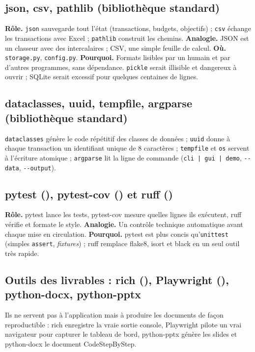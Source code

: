 \documentclass[11pt,a4paper]{article}
\newcommand{\code}[1]{{\NoAutoSpacing\texttt{#1}}}
\begin{document}
\subsection{json, csv, pathlib (bibliothèque standard)}
\textbf{Rôle.} \code{json} sauvegarde tout l'état (transactions, budgets, objectifs) ;
\code{csv} échange les transactions avec Excel ; \code{pathlib} construit les chemins.
\textbf{Analogie.} JSON est un classeur avec des intercalaires ; CSV, une simple feuille de
calcul. \textbf{Où.} \code{storage.py}, \code{config.py}.
\textbf{Pourquoi.} Formats lisibles par un humain et par d'autres programmes, sans
dépendance. \code{pickle} serait illisible et dangereux à ouvrir ; SQLite serait excessif
pour quelques centaines de lignes.

\subsection{dataclasses, uuid, tempfile, argparse (bibliothèque standard)}
\code{dataclasses} génère le code répétitif des classes de données ; \code{uuid} donne à
chaque transaction un identifiant unique de 8 caractères ; \code{tempfile} et \code{os}
servent à l'écriture atomique ; \code{argparse} lit la ligne de commande
(\code{cli | gui | demo}, \code{-{}-data}, \code{-{}-output}).

\subsection{pytest (\VerPytest), pytest-cov (\VerPytestCov) et ruff (\VerRuff)}
\textbf{Rôle.} pytest lance les tests, pytest-cov mesure quelles lignes ils exécutent, ruff
vérifie et formate le style. \textbf{Analogie.} Un contrôle technique automatique avant
chaque mise en circulation. \textbf{Pourquoi.} pytest est plus concis qu'\code{unittest}
(simples \code{assert}, \emph{fixtures}) ; ruff remplace flake8, isort et black en un seul
outil très rapide.

\subsection{Outils des livrables : rich (\VerRich), Playwright (\VerPlaywright), python-docx, python-pptx}
Ils ne servent pas à l'application mais à produire les documents de façon reproductible :
rich enregistre la vraie sortie console, Playwright pilote un vrai navigateur pour capturer le
tableau de bord, python-pptx génère les slides et python-docx le document CodeStepByStep.
\end{document}
